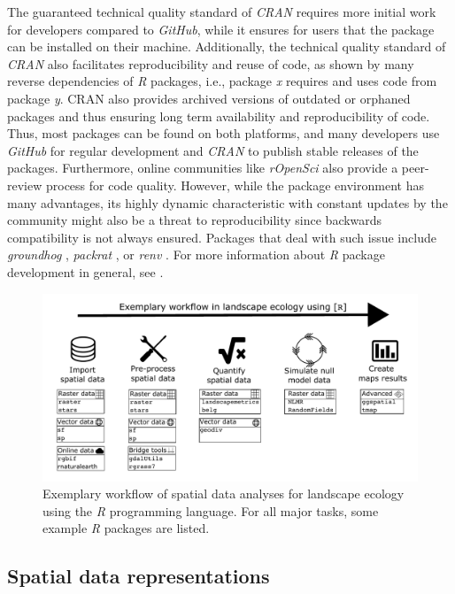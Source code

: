 \documentclass[smallextended]{svjour3}       %
\begin{document}
The guaranteed technical quality standard of \emph{CRAN} requires more initial work for developers compared to \emph{GitHub}, while it ensures for users that the package can be installed on their machine.
Additionally, the technical quality standard of \emph{CRAN} also facilitates reproducibility and reuse of code, as shown by many reverse dependencies of \emph{R} packages, i.e., package \emph{x} requires and uses code from package \emph{y}.
CRAN also provides archived versions of outdated or orphaned packages and thus ensuring long term availability and reproducibility of code.
Thus, most packages can be found on both platforms, and many developers use \emph{GitHub} for regular development and \emph{CRAN} to publish stable releases of the packages.
Furthermore, online communities like \emph{rOpenSci} also provide a peer-review process for code quality.
However, while the package environment has many advantages, its highly dynamic characteristic with constant updates by the community might also be a threat to reproducibility since backwards compatibility is not always ensured.
Packages that deal with such issue include \emph{groundhog} \cite{Simonsohn2021}, \emph{packrat} \cite{Ushey2018}, or \emph{renv} \cite{Ushey2020}.
For more information about \emph{R} package development in general, see \cite{Wickham2015}.



\begin{figure}
\includegraphics[width=\linewidth]{data/Figure_1} \caption{Exemplary workflow of spatial data analyses for landscape ecology using the \emph{R} programming language. For all major tasks, some example \emph{R} packages are listed.}\label{fig:fig-workflow}
\end{figure}

\hypertarget{sec:spatrep}{%
\subsection{Spatial data representations}\label{sec:spatrep}}
\end{document}
